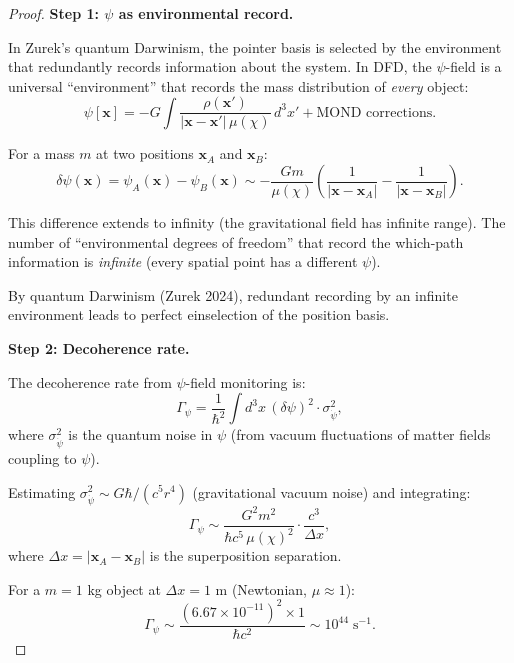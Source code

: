 \documentclass[11pt,a4paper]{article}
\begin{document}
\begin{proof}
\textbf{Step 1: $\psi$ as environmental record.}

In Zurek's quantum Darwinism, the pointer basis is selected by the environment that redundantly records information about the system. In DFD, the $\psi$-field is a universal ``environment'' that records the mass distribution of \emph{every} object:
\begin{equation}
\psi[\mathbf{x}] = -G\int\frac{\rho(\mathbf{x}')}{|\mathbf{x} - \mathbf{x}'|\,\mu(\chi)}\,d^3x' + \text{MOND corrections}.
\end{equation}

For a mass $m$ at two positions $\mathbf{x}_A$ and $\mathbf{x}_B$:
\begin{equation}
\delta\psi(\mathbf{x}) = \psi_A(\mathbf{x}) - \psi_B(\mathbf{x}) \sim -\frac{Gm}{\mu(\chi)}\left(\frac{1}{|\mathbf{x}-\mathbf{x}_A|} - \frac{1}{|\mathbf{x}-\mathbf{x}_B|}\right).
\end{equation}

This difference extends to infinity (the gravitational field has infinite range). The number of ``environmental degrees of freedom'' that record the which-path information is \emph{infinite} (every spatial point has a different $\psi$).

By quantum Darwinism (Zurek 2024), redundant recording by an infinite environment leads to perfect einselection of the position basis.

\textbf{Step 2: Decoherence rate.}

The decoherence rate from $\psi$-field monitoring is:
\begin{equation}
\Gamma_{\psi} = \frac{1}{\hbar^2}\int d^3x\,(\delta\psi)^2\cdot\sigma_{\dot\psi}^2,
\end{equation}
where $\sigma_{\dot\psi}^2$ is the quantum noise in $\psi$ (from vacuum fluctuations of matter fields coupling to $\psi$).

Estimating $\sigma_{\dot\psi}^2 \sim G\hbar/(c^5 r^4)$ (gravitational vacuum noise) and integrating:
\begin{equation}
\Gamma_\psi \sim \frac{G^2 m^2}{\hbar c^5\,\mu(\chi)^2}\cdot\frac{c^3}{\Delta x},
\end{equation}
where $\Delta x = |\mathbf{x}_A - \mathbf{x}_B|$ is the superposition separation.

For a $m = 1$ kg object at $\Delta x = 1$ m (Newtonian, $\mu \approx 1$):
\begin{equation}
\Gamma_\psi \sim \frac{(6.67\times 10^{-11})^2 \times 1}{\hbar c^2} \sim 10^{44}\;\text{s}^{-1}.
\end{equation}


\end{proof}
\end{document}
